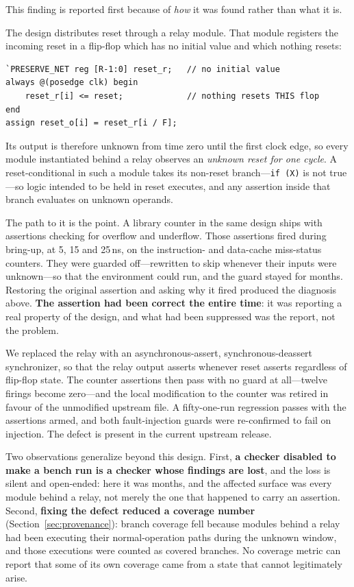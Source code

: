 \documentclass[conference]{IEEEtran}
\newcommand{\code}[1]{\texttt{\small #1}}
\begin{document}
This finding is reported first because of \emph{how} it was found rather
than what it is.

The design distributes reset through a relay module. That module registers
the incoming reset in a flip-flop which has no initial value and which
nothing resets:

\begin{lstlisting}
`PRESERVE_NET reg [R-1:0] reset_r;   // no initial value
always @(posedge clk) begin
    reset_r[i] <= reset;             // nothing resets THIS flop
end
assign reset_o[i] = reset_r[i / F];
\end{lstlisting}

Its output is therefore unknown from time zero until the first clock edge,
so every module instantiated behind a relay observes an \emph{unknown reset
for one cycle}. A reset-conditional in such a module takes its non-reset
branch---\code{if (X)} is not true---so logic intended to be held in reset
executes, and any assertion inside that branch evaluates on unknown
operands.

The path to it is the point. A library counter in the same design ships
with assertions checking for overflow and underflow. Those assertions fired
during bring-up, at 5, 15 and 25\,ns, on the instruction- and data-cache
miss-status counters. They were guarded off---rewritten to skip whenever
their inputs were unknown---so that the environment could run, and the
guard stayed for months. Restoring the original assertion and asking why it
fired produced the diagnosis above. \textbf{The assertion had been correct
the entire time}: it was reporting a real property of the design, and what
had been suppressed was the report, not the problem.

We replaced the relay with an asynchronous-assert, synchronous-deassert
synchronizer, so that the relay output asserts whenever reset asserts
regardless of flip-flop state. The counter assertions then pass with no
guard at all---twelve firings become zero---and the local modification to
the counter was retired in favour of the unmodified upstream file. A
fifty-one-run regression passes with the assertions armed, and both
fault-injection guards were re-confirmed to fail on injection. The defect
is present in the current upstream release.

Two observations generalize beyond this design. First, \textbf{a checker
disabled to make a bench run is a checker whose findings are lost}, and the
loss is silent and open-ended: here it was months, and the affected surface
was every module behind a relay, not merely the one that happened to carry
an assertion. Second, \textbf{fixing the defect reduced a coverage number}
(Section~\ref{sec:provenance}): branch coverage fell because modules behind
a relay had been executing their normal-operation paths during the unknown
window, and those executions were counted as covered branches. No coverage
metric can report that some of its own coverage came from a state that
cannot legitimately arise.
\end{document}
